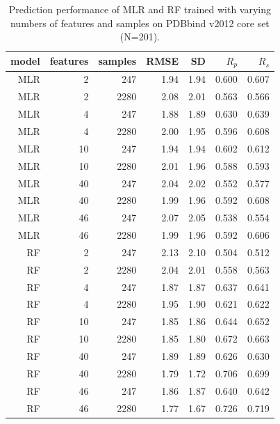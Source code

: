 \documentclass[journal=jacsat,manuscript=article]{achemso}
\begin{document}
\begin{table}
\caption{Prediction performance of MLR and RF trained with varying numbers of features and samples on PDBbind v2012 core set (N=201).}
\label{tbl:tst201}
\begin{tabular}{rrrrrrr}
\hline
model & features & samples & RMSE & SD & $R_p$ & $R_s$\\
\hline
MLR &  2 &  247 & 1.94 & 1.94 & 0.600 & 0.607\\
MLR &  2 & 2280 & 2.08 & 2.01 & 0.563 & 0.566\\
MLR &  4 &  247 & 1.88 & 1.89 & 0.630 & 0.639\\
MLR &  4 & 2280 & 2.00 & 1.95 & 0.596 & 0.608\\
MLR & 10 &  247 & 1.94 & 1.94 & 0.602 & 0.612\\
MLR & 10 & 2280 & 2.01 & 1.96 & 0.588 & 0.593\\
MLR & 40 &  247 & 2.04 & 2.02 & 0.552 & 0.577\\
MLR & 40 & 2280 & 1.99 & 1.96 & 0.592 & 0.608\\
MLR & 46 &  247 & 2.07 & 2.05 & 0.538 & 0.554\\
MLR & 46 & 2280 & 1.99 & 1.96 & 0.592 & 0.606\\
 RF &  2 &  247 & 2.13 & 2.10 & 0.504 & 0.512\\
 RF &  2 & 2280 & 2.04 & 2.01 & 0.558 & 0.563\\
 RF &  4 &  247 & 1.87 & 1.87 & 0.637 & 0.641\\
 RF &  4 & 2280 & 1.95 & 1.90 & 0.621 & 0.622\\
 RF & 10 &  247 & 1.85 & 1.86 & 0.644 & 0.652\\
 RF & 10 & 2280 & 1.85 & 1.80 & 0.672 & 0.663\\
 RF & 40 &  247 & 1.89 & 1.89 & 0.626 & 0.630\\
 RF & 40 & 2280 & 1.79 & 1.72 & 0.706 & 0.699\\
 RF & 46 &  247 & 1.86 & 1.87 & 0.640 & 0.642\\
 RF & 46 & 2280 & 1.77 & 1.67 & 0.726 & 0.719\\
\hline
\end{tabular}
\end{table}
\end{document}
